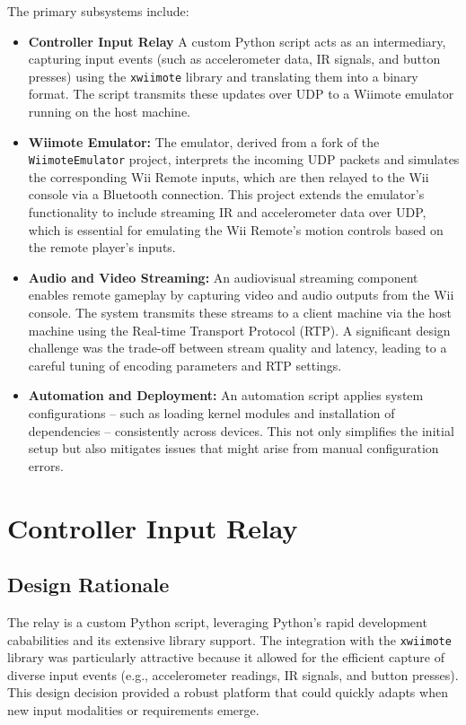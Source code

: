 The primary subsystems include:
\begin{itemize}
	\item \textbf{Controller Input Relay}
	      A custom Python script acts as an intermediary, capturing input events
	      (such as accelerometer data, IR signals, and button presses) using the
	      \texttt{xwiimote} library\cite{xwiimote} and translating them into a binary
	      format. The script transmits these updates over UDP\cite{wikipediaUDP} to a Wiimote emulator running on the host machine.

	\item \textbf{Wiimote Emulator:}
	      The emulator, derived from a fork\cite{jr_wiimote_emu} of the
	      \texttt{WiimoteEmulator} project\cite{wiimote_emulator}, interprets the incoming
	      UDP packets and simulates the corresponding Wii Remote inputs, which are then
	      relayed to the Wii console via a Bluetooth connection. This project extends the
	      emulator's functionality to include streaming IR and accelerometer data over
	      UDP, which is essential for emulating the Wii Remote's motion controls based on
	      the remote player's inputs.

	\item \textbf{Audio and Video Streaming:}
	      An audiovisual streaming component enables remote gameplay by capturing
	      video and audio outputs from the Wii console. The system transmits these streams
	      to a client machine via the host machine using the Real-time Transport Protocol
	      (RTP)\cite{wikipediaRTP}. A significant design challenge was the trade-off
	      between stream quality and latency, leading to a careful tuning of encoding
	      parameters and RTP settings.

	\item \textbf{Automation and Deployment:}
	      An automation script applies system configurations  -- such as loading
	      kernel modules and installation of dependencies  -- consistently across devices.
	      This not only simplifies the initial setup but also mitigates issues that might
	      arise from manual configuration errors.
\end{itemize}

\section{Controller Input Relay}

\subsection{Design Rationale}
The relay is a custom Python script, leveraging Python’s rapid development cababilities and its extensive library support. The integration with the \texttt{xwiimote} library was particularly attractive because it allowed for the efficient capture of diverse input events (e.g., accelerometer readings, IR signals, and button presses). This design decision provided a robust platform that could quickly adapts when new input modalities or requirements emerge.

